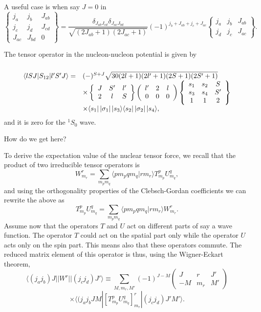 A useful case is when say $J=0$ in 
\[
\left\{\begin{array}{ccc} j_a & j_b& J_{ab} \\ j_c & j_d & J_{cd} \\ J_{ac} & J_{bd}& 0\end{array}\right\}=\frac{\delta_{J_{ab}J_{cd}} \delta_{J_{ac}J_{bd}}}{\sqrt{(2J_{ab}+1)(2J_{ac}+1)}} (-1)^{j_b+J_{ab}+j_c+J_{ac}} \begin{Bmatrix} j_a & j_b & J_{ab}\\ j_d & j_c & J_{ac} \end{Bmatrix}. 
\]

The tensor operator in the nucleon-nucleon potential
is given by
\[
\begin{array}{ll}
&\\
\langle lSJ |S_{12}|l'S'J\rangle =&
(-)^{S+J}\sqrt{30(2l+1)(2l'+1)(2S+1)(2S'+1)}\\
&\times\left\{\begin{array}{ccc}J&S'&l'\\2&l&S\end{array}\right\}
\left(\begin{array}{ccc}l'&2&l\\0&0&0\end{array}\right)
\left\{\begin{array}{ccc}s_{1}&s_{2}&S\\s_{3}&s_{4}&S'\\
1&1&2\end{array}
\right\}\\
&\times\langle s_{1} |\left | \sigma_{1}\right | |s_{3}\rangle
\langle s_{2} |\left | \sigma_{2}\right | |s_{4}\rangle,
\end{array}
\]
and it is zero for the $^1S_0$ wave. 

How do we get here?

To derive the expectation value of the nuclear tensor force, we recall that 
the product of two irreducible tensor operators is
\[
W^{r}_{m_r}=\sum_{m_pm_q}\langle pm_pqm_q|rm_r\rangle T^{p}_{m_p}U^{q}_{m_q},
\] 
and using the orthogonality properties of the Clebsch-Gordan coefficients we can rewrite the above as
\[
T^{p}_{m_p}U^{q}_{m_q}=\sum_{m_pm_q}\langle pm_pqm_q|rm_r\rangle W^{r}_{m_r}.
\] 
Assume now that the operators $T$ and $U$ act on different parts of say a wave function. The operator $T$ could act on the spatial part only while the operator $U$ acts only on the spin part. This means also that these operators commute.
The reduced matrix element of this operator is thus, using the Wigner-Eckart theorem,
\[
\langle (j_aj_b)J||W^{r}||(j_cj_d)J'\rangle\equiv\sum_{M,m_r,M'}(-1)^{J-M}\left(\begin{array}{ccc}  J & r & J' \\ -M & m_r & M'\end{array}\right)
\]
\[
\times\langle (j_aj_bJM|\left[ T^{p}_{m_p}U^{q}_{m_q} \right]^{r}_{m_r}|(j_cj_d)J'M'\rangle.
\]

